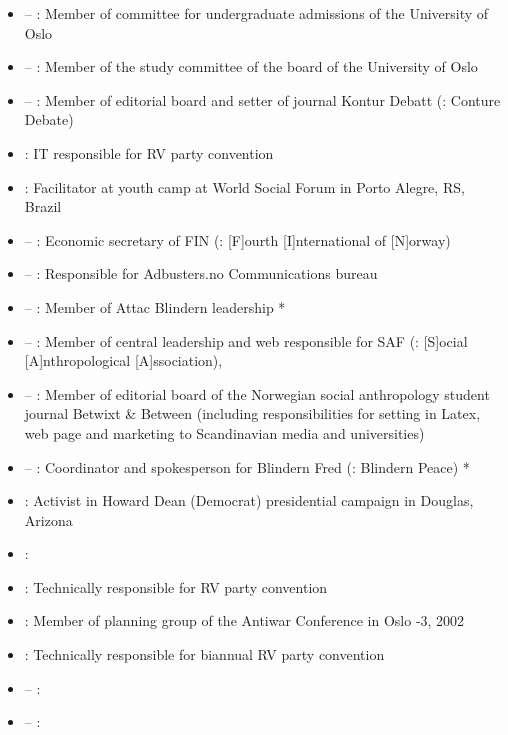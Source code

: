 \begin{itemize}
\item {} – : Member of committee for undergraduate admissions of the University of Oslo
\item {} – : Member of the study committee of the board of the University of Oslo
\item {} – : Member of editorial board and setter of journal Kontur Debatt (\english: Conture Debate)
\item {}: IT responsible for RV party convention
\item {}: Facilitator at youth camp at World Social Forum in Porto Alegre, RS, Brazil
\item {} – : Economic secretary of FIN (\english: [F]ourth [I]nternational of [N]orway)
\item {} – : Responsible for Adbusters.no Communications bureau
\item {} –  : Member of Attac Blindern leadership *
\item {} – : Member of central leadership and web responsible for SAF (\english: [S]ocial [A]nthropological [A]ssociation), \uio
\item {} – : Member of editorial board of the Norwegian social anthropology student journal Betwixt \& Between
(including responsibilities for setting in Latex, web page and marketing to Scandinavian media and universities)
\item {} –  : Coordinator and spokesperson for Blindern Fred (\english: Blindern Peace) *
\item {}: Activist in Howard Dean (Democrat) presidential campaign in Douglas, Arizona
\item {}: 
\item {}: Technically responsible for RV party convention
\item {}: Member of planning group of the Antiwar Conference in Oslo -3, 2002
\item {}: Technically responsible for biannual RV party convention
\item {} – : 
\item {} – : 

\end{itemize}
